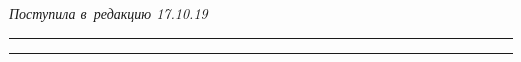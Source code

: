 \vspace*{-3pt}





\hfill{\small\textit{Поступила в~редакцию 17.10.19}}














\vspace*{8pt}





\hrule





\vspace*{2pt}















\hrule





\vspace*{8pt}





\def\tit{INFORMATION AND ANALYTICAL SITUATIONAL CENTER 


FOR~STRATEGIC PLANNING IN~THE~FIELD OF~NATIONAL SECURITY: 


FACTORS OF~INFLUENCE}





\def\titkol{Information and analytical situational center 


for~strategic planning}











\def\aut{A.\,V.~Bosov and~A.\,P.~Suchkov}





\def\autkol{A.\,V.~Bosov and~A.\,P.~Suchkov}











